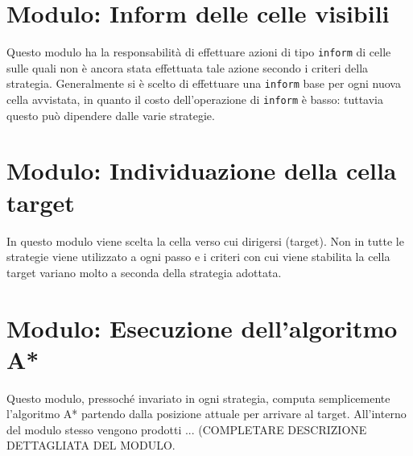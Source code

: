 \section{Modulo: Inform delle celle visibili} \label{sec:inform}
Questo modulo ha la responsabilità di effettuare azioni di tipo \texttt{inform} di celle sulle quali non è ancora stata effettuata tale azione secondo i criteri della strategia. Generalmente si è scelto di effettuare una \texttt{inform} base per ogni nuova cella avvistata, in quanto il costo dell'operazione di \texttt{inform} è basso: tuttavia questo può dipendere dalle varie strategie.

\section{Modulo: Individuazione della cella target} \label{sec:target}
In questo modulo viene scelta la cella verso cui dirigersi (target). {\color{red} Non in tutte le strategie viene utilizzato a ogni passo} e i criteri con cui viene stabilita la cella target variano molto a seconda della strategia adottata.

\section{Modulo: Esecuzione dell'algoritmo A*} \label{sec:astar}
Questo modulo, {\color{red}pressoché invariato in ogni strategia}, computa semplicemente l'algoritmo A* partendo dalla posizione attuale per arrivare al target. All'interno del modulo stesso vengono prodotti {\color{red} ... (COMPLETARE DESCRIZIONE DETTAGLIATA DEL MODULO}.

